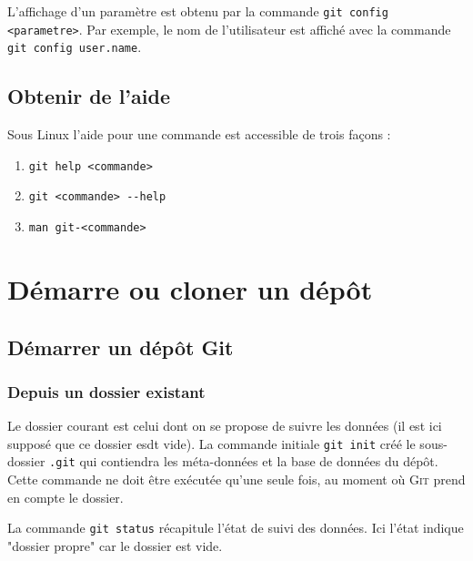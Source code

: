 \documentclass[11pt,twoside,headings=normal,open=right,french,DIV=12]{scrreprt}
\newcommand{\git}{\textsc{Git}}
\begin{document}
    L'affichage d'un paramètre est obtenu par la commande \verb|git config  <parametre>|. Par exemple, le nom de
    l'utilisateur est affiché avec la commande \verb|git config user.name|.



\section{Obtenir de l'aide}



    Sous Linux l'aide pour une commande est accessible de trois façons :
    \begin{enumerate}
        \item \verb|git help <commande>|
        \item \verb|git <commande> --help|
        \item \verb|man git-<commande>|
    \end{enumerate}



\chapter{Démarre ou cloner un dépôt}



\section{Démarrer un dépôt Git}



\subsection{Depuis un dossier existant}
\label{sec-dossier_existant}


    Le dossier courant est celui dont on se propose de suivre les données (il est ici supposé que ce dossier esdt vide). La commande initiale \verb|git init|
    créé le sous-dossier \verb|.git| qui contiendra les méta-données et la base de données du dépôt. Cette
    commande ne doit être exécutée qu'une seule fois, au moment où \git{} prend en compte le dossier.
    
    \smallskip
    
    La commande \verb|git status| récapitule l'état de suivi des données. Ici l'état indique "dossier propre"
    car le dossier est vide.
    
    \smallskip
    
\end{document}
